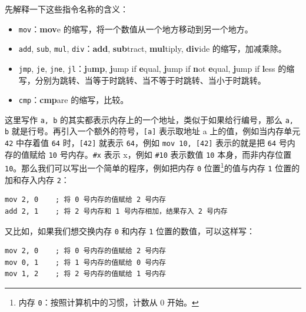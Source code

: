 先解释一下这些指令名称的含义：
\begin{itemize}
    \item \texttt{mov}：\textbf{mov}e 的缩写，将一个数值从一个地方移动到另一个地方。
    \item \texttt{add}, \texttt{sub}, \texttt{mul}, \texttt{div}：\textbf{add}, \textbf{sub}tract, \textbf{mul}tiply, \textbf{div}ide 的缩写，加减乘除。
    \item \texttt{jmp}, \texttt{je}, \texttt{jne}, \texttt{jl}：\textbf{j}u\textbf{mp}, \textbf{j}ump if \textbf{e}qual, \textbf{j}ump if \textbf{n}ot \textbf{e}qual, \textbf{j}ump if \textbf{l}ess 的缩写，分别为跳转、当等于时跳转、当不等于时跳转、当小于时跳转。
    \item \texttt{cmp}：\textbf{cmp}are 的缩写，比较。
\end{itemize}

这里写作 \texttt{a, b} 的其实都表示内存上的一个地址，类似于如果给行编号，那么 \texttt{a, b} 就是行号。再引入一个额外的符号，\texttt{[a]} 表示取地址 a 上的值，例如当内存单元 \texttt{42} 中存着值 \texttt{64} 时，\texttt{[42]} 就表示 \texttt{64}，例如 \texttt{mov 10, [42]} 表示的就是把 \texttt{64} 号内存的值赋给 \texttt{10} 号内存。\texttt{\#x} 表示 x，例如 \texttt{\#10} 表示数值 \texttt{10} 本身，而非内存位置 \texttt{10}。那么我们可以写出一个简单的程序，例如把内存 \texttt{0} 位置\footnote{内存 \texttt{0}：按照计算机中的习惯，计数从 0 开始。}的值与内存 \texttt{1} 位置的加和存入内存 \texttt{2}：
\begin{verbatim}
mov 2, 0    ; 将 0 号内存的值赋给 2 号内存
add 2, 1    ; 将 2 号内存和 1 号内存相加，结果存入 2 号内存
\end{verbatim}

又比如，如果我们想交换内存 \texttt{0} 和内存 \texttt{1} 位置的数值，可以这样写：
\begin{verbatim}
mov 2, 0    ; 将 0 号内存的值赋给 2 号内存
mov 0, 1    ; 将 1 号内存的值赋给 0 号内存
mov 1, 2    ; 将 2 号内存的值赋给 1 号内存
\end{verbatim}

